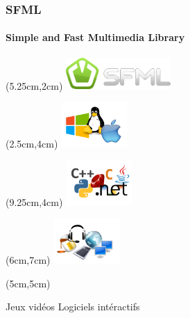 \begin{frame}
	
	\frametitle{SFML}
	\framesubtitle{Simple and Fast Multimedia Library}
	
	
	\begin{textblock*}{4cm}(5.25cm,2cm)
		\includegraphics[width=4cm]{figures/logo_sfml.png}
	\end{textblock*}
	
	{
		\begin{textblock*}{2.5cm}(2.5cm,4cm)
			\includegraphics[width=2.5cm]{figures/sfml_multiplatform.png}
		\end{textblock*}
	}
	
	{
		\begin{textblock*}{2.5cm}(9.25cm,4cm)
			\includegraphics[width=2.5cm]{figures/sfml_multilanguage.png}
		\end{textblock*}
	}
	
	{
		\begin{textblock*}{2.5cm}(6cm,7cm)
			\includegraphics[width=2.5cm]{figures/sfml_modules.png}
		\end{textblock*}
	}
	
	{
		\begin{textblock*}{4cm}(5cm,5cm)
			\begin{center}
				Jeux vidéos
				\vfill
				Logiciels intéractifs
			\end{center}
		\end{textblock*}
	}
	
	
\end{frame}
